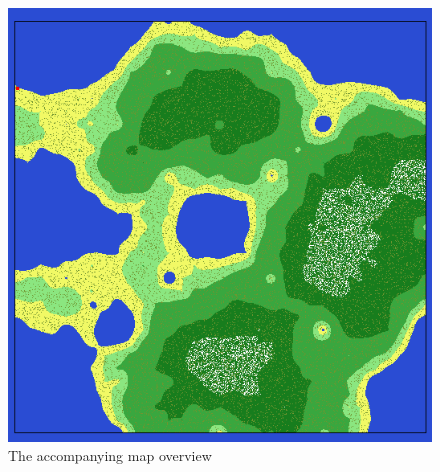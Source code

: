 \documentclass{article}
\begin{document}
\begin{figure}[H]
	\centering
	\includegraphics[width=0.9\linewidth,trim=4 4 4 4,clip]{finalmap.png}
	\renewcommand{\figurename}{Example}
	\caption{The accompanying map overview}
\end{figure}

\clearpage
\end{document}
